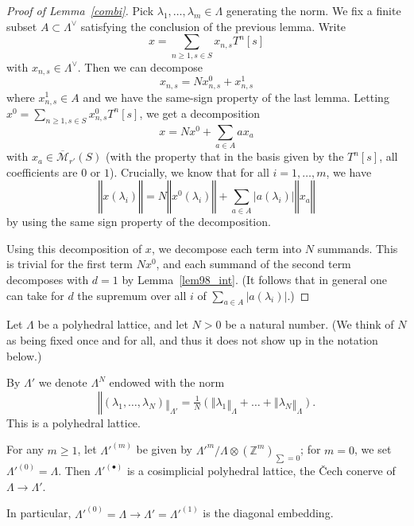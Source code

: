 \begin{proof}[{Proof of Lemma~\ref{combi}}]
  \leanok
  Pick $\lambda_1,\ldots,\lambda_m\in \Lambda$ generating the norm. We fix a finite subset $A\subset \Lambda^\vee$ satisfying the conclusion of the previous lemma. Write
  \[
  x=\sum_{n\geq 1, s\in S} x_{n,s} T^n [s]
  \]
  with $x_{n,s}\in \Lambda^\vee$. Then we can decompose
  \[
  x_{n,s} = N x_{n,s}^0 + x_{n,s}^1
  \]
  where $x_{n,s}^1\in A$ and we have the same-sign property of the last lemma. Letting $x^0 = \sum_{n\geq 1, s\in S} x_{n,s}^0 T^n [s]$, we get a decomposition
  \[
  x = Nx^0 + \sum_{a\in A} a x_a
  \]
  with $x_a\in \overline{\mathcal M}_{r'}(S)$ (with the property that in the
  basis given by the $T^n [s]$, all coefficients are $0$ or $1$). Crucially,
  we know that for all $i=1,\ldots,m$, we have
  \[
  ‖x(\lambda_i)‖ = N ‖x^0(\lambda_i)‖ + \sum_{a\in A} |a(\lambda_i)| ‖x_a‖
  \]
  by using the same sign property of the decomposition.

  Using this decomposition of $x$, we decompose each term into $N$ summands.
  This is trivial for the first term $Nx^0$,
  and each summand of the second term decomposes with $d = 1$ by Lemma~\ref{lem98_int}.
  (It follows that in general one can take for $d$
  the supremum over all $i$ of $\sum_{a\in A} |a(\lambda_i)|$.)
\end{proof}

\begin{definition}
  \label{rescaled-sum}
  \leanok
  Let $\Lambda$ be a polyhedral lattice, and let $N > 0$ be a natural number.
  (We think of $N$ as being fixed once and for all,
  and thus it does not show up in the notation below.)

  By $\Lambda'$ we denote $\Lambda^N$ endowed with the norm
  \[
	  ‖(\lambda_1,\ldots,\lambda_N)‖_{\Lambda'} = \tfrac 1N(‖\lambda_1‖_\Lambda+\ldots+‖\lambda_N‖_\Lambda).
  \]
  This is a polyhedral lattice.
\end{definition}

\begin{definition}
  \label{cosimplicial-lattice}
  For any $m\geq 1$, let $\Lambda'^{(m)}$ be given by $\Lambda'^m / \Lambda\otimes (\mathbb Z^m)_{\sum=0}$;
  for $m=0$, we set $\Lambda'^{(0)} = \Lambda$.
  Then $\Lambda'^{(\bullet)}$ is a cosimplicial polyhedral lattice,
  the \v{C}ech conerve of $\Lambda\to \Lambda'$.

  In particular, $\Lambda'^{(0)} = \Lambda \to \Lambda' = \Lambda'^{(1)}$
  is the diagonal embedding.
\end{definition}


